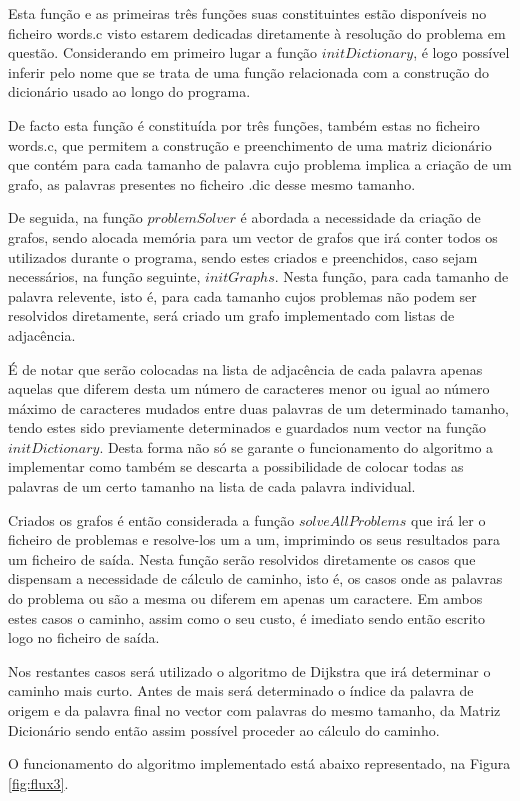 \documentclass[a4paper, 11pt]{article}
\begin{document}
    
    \par Esta função e as primeiras três funções suas constituintes estão disponíveis no ficheiro words.c visto estarem dedicadas diretamente à resolução do problema em questão. Considerando em primeiro lugar a função $initDictionary$, é logo possível inferir pelo nome que se trata de uma função relacionada com a construção do dicionário usado ao longo do programa.
    \par De facto esta função é constituída por três funções, também estas no ficheiro words.c, que permitem a construção e preenchimento de uma matriz dicionário que contém para cada tamanho de palavra cujo problema implica a criação de um grafo, as palavras presentes no ficheiro .dic desse mesmo tamanho.
    \par De seguida, na função $problemSolver$ é abordada a necessidade da criação de grafos, sendo alocada memória para um vector de grafos que irá conter todos os utilizados durante o programa, sendo estes criados e preenchidos, caso sejam necessários, na função seguinte, $initGraphs$. Nesta função, para cada tamanho de palavra relevente, isto é, para cada tamanho cujos problemas não podem ser resolvidos diretamente, será criado um grafo implementado com listas de adjacência.
    \par É de notar que serão colocadas na lista de adjacência de cada palavra apenas aquelas que diferem desta um número de caracteres menor ou igual ao número máximo de caracteres mudados entre duas palavras de um determinado tamanho, tendo estes sido previamente determinados e guardados num vector na função $initDictionary$.
    Desta forma não só se garante o funcionamento do algoritmo a implementar como também se descarta a possibilidade de colocar todas as palavras de um certo tamanho na lista de cada palavra individual.
    
    \par Criados os grafos é então considerada a função $solveAllProblems$ que irá ler o ficheiro de problemas e resolve-los um a um, imprimindo os seus resultados para um ficheiro de saída.
    Nesta função serão resolvidos diretamente os casos que dispensam a necessidade de cálculo de caminho, isto é, os casos onde as palavras do problema ou são a mesma ou diferem em apenas um caractere. Em ambos estes casos o caminho, assim como o seu custo, é imediato sendo então escrito logo no ficheiro de saída. 
    \par Nos restantes casos será utilizado o algoritmo de Dijkstra que irá determinar o caminho mais curto.
    Antes de mais será determinado o índice da palavra de origem e da palavra final no vector com palavras do mesmo tamanho, da Matriz Dicionário sendo então assim possível proceder ao cálculo do caminho. 
    \par O funcionamento do algoritmo implementado está abaixo representado, na Figura \ref{fig:flux3}.
    
\end{document}
